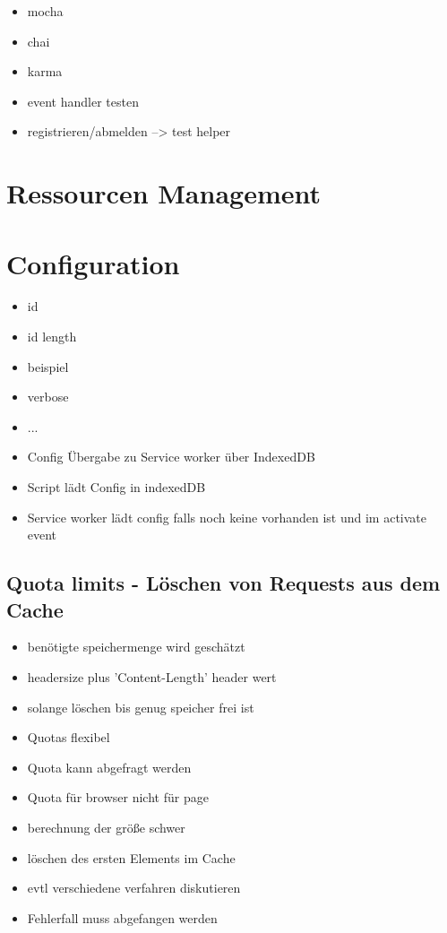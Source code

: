 \begin{itemize}
  \item mocha
  \item chai
  \item karma
  \item event handler testen
  \item registrieren/abmelden --> test helper
\end{itemize}


\section{Ressourcen Management}



\section{Configuration}

\begin{itemize}
	\item id
	\item id length
	\item beispiel
	\item verbose
	\item ...
	\item Config Übergabe zu Service worker über IndexedDB
	\item Script lädt Config in indexedDB
	\item Service worker lädt config falls noch keine vorhanden ist und im activate event	
\end{itemize}

\subsection{Quota limits - Löschen von Requests aus dem Cache}

\begin{itemize}
  \item benötigte speichermenge wird geschätzt
  \item headersize plus 'Content-Length' header wert
  \item solange löschen bis genug speicher frei ist
  \item Quotas flexibel
	\item Quota kann abgefragt werden
	\item Quota für browser nicht für page
	\item berechnung der größe schwer
	\item löschen des ersten Elements im Cache
	\item evtl verschiedene verfahren diskutieren
	\item Fehlerfall muss abgefangen werden
\end{itemize}

